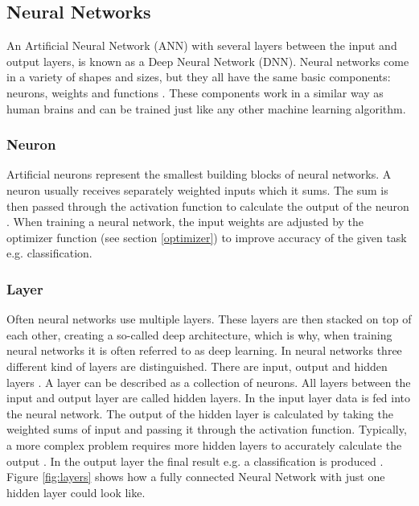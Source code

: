 \subsection{Neural Networks}

An Artificial Neural Network (ANN) with several layers between the input and output layers, is known as a Deep Neural Network (DNN). Neural networks come in a variety of shapes and sizes, but they all have the same basic components: neurons, weights and functions \parencite{Fumo2017}. These components work in a similar way as human brains and can be trained just like any other machine learning algorithm.

\subsubsection{Neuron}
Artificial neurons represent the smallest building blocks of neural networks. A neuron usually receives separately weighted inputs which it sums. The sum is then passed through the activation function to calculate the output of the neuron \parencite{Fumo2017}. When training a neural network, the input weights are adjusted by the optimizer function (see section \ref{optimizer}) to improve accuracy of the given task e.g. classification.

\subsubsection{Layer}
Often neural networks use multiple layers. These layers are then stacked on top of each other, creating a so-called deep architecture, which is why, when training neural networks it is often referred to as deep learning. In neural networks three different kind of layers are distinguished. There are input, output and hidden layers \parencite{Fumo2017}. A layer can be described as a collection of neurons. All layers between the input and output layer are called hidden layers. In the input layer data is fed into the neural network. The output of the hidden layer is calculated by taking the weighted sums of input and passing it through the activation function. Typically, a more complex problem requires more hidden layers to accurately calculate the output \parencite{Gad2018}. In the output layer the final result e.g. a classification is produced \parencite{Fumo2017}. Figure \ref{fig:layers} shows how a fully connected Neural Network with just one hidden layer could look like.


